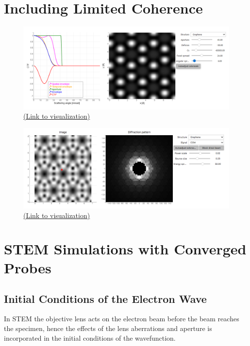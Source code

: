\documentclass[%
 superscriptaddress,
 aip,
 amsmath,amssymb,
preprint,%
 author-year,%
longbibliography
]{revtex4-2}
\begin{document}
\section*{Including Limited Coherence}

\begin{figure}[h]
    \includegraphics[width=1\textwidth]{figures/hrtem.png}
    \caption{\href{https://boiling-wildwood-85903.herokuapp.com/voila/render/hrtem.ipynb}{(Link to visualization)}}
\end{figure}

\begin{figure}[h]
    \includegraphics[width=1\textwidth]{figures/limited_coherence_STEM.png}
    \caption{\href{https://tem-elements.herokuapp.com/voila/render/notebooks/limited_coherence_STEM.ipynb}{(Link to visualization)}}
\end{figure}



\section*{STEM Simulations with Converged Probes}\label{STEM_SIMS}

\subsection*{Initial Conditions of the Electron Wave}
In STEM the objective lens acts on the electron beam before the beam reaches the specimen, hence the effects of the lens aberrations and aperture is incorporated in the initial conditions of the wavefunction.
\end{document}

